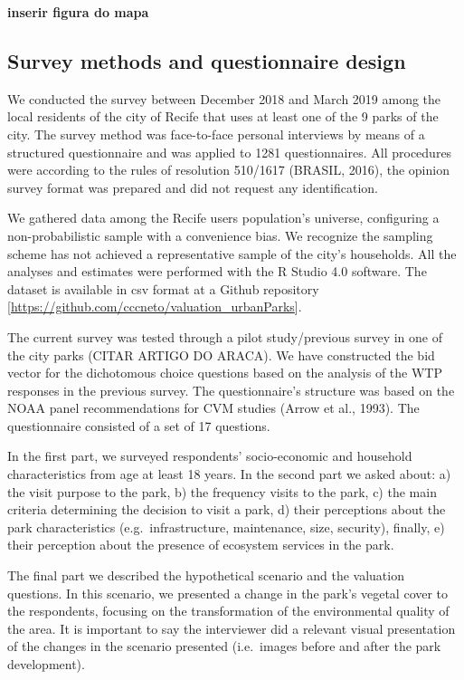 \documentclass[
]{article}
\begin{document}
\textbf{inserir figura do mapa}

\hypertarget{survey-methods-and-questionnaire-design}{%
\subsection{Survey methods and questionnaire
design}\label{survey-methods-and-questionnaire-design}}

We conducted the survey between December 2018 and March 2019 among the
local residents of the city of Recife that uses at least one of the 9
parks of the city. The survey method was face-to-face personal
interviews by means of a structured questionnaire and was applied to
1281 questionnaires. All procedures were according to the rules of
resolution 510/1617 (BRASIL, 2016), the opinion survey format was
prepared and did not request any identification.

We gathered data among the Recife users population's universe,
configuring a non-probabilistic sample with a convenience bias. We
recognize the sampling scheme has not achieved a representative sample
of the city's households. All the analyses and estimates were performed
with the R Studio 4.0 software. The dataset is available in csv format
at a Github repository
{[}\url{https://github.com/cccneto/valuation_urbanParks}{]}.

The current survey was tested through a pilot study/previous survey in
one of the city parks (CITAR ARTIGO DO ARACA). We have constructed the
bid vector for the dichotomous choice questions based on the analysis of
the WTP responses in the previous survey. The questionnaire's structure
was based on the NOAA panel recommendations for CVM studies (Arrow et
al., 1993). The questionnaire consisted of a set of 17 questions.

In the first part, we surveyed respondents' socio-economic and household
characteristics from age at least 18 years. In the second part we asked
about: a) the visit purpose to the park, b) the frequency visits to the
park, c) the main criteria determining the decision to visit a park, d)
their perceptions about the park characteristics (e.g.~infrastructure,
maintenance, size, security), finally, e) their perception about the
presence of ecosystem services in the park.

The final part we described the hypothetical scenario and the valuation
questions. In this scenario, we presented a change in the park's vegetal
cover to the respondents, focusing on the transformation of the
environmental quality of the area. It is important to say the
interviewer did a relevant visual presentation of the changes in the
scenario presented (i.e.~images before and after the park development).
\end{document}
